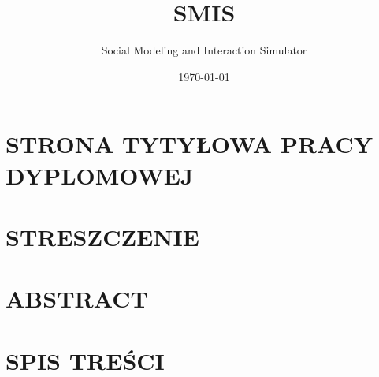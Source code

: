\documentclass{article}
\title{SMIS}
\author{Social Modeling and Interaction Simulator}
\date{\today}
\begin{document}
    \section*{STRONA TYTYŁOWA PRACY DYPLOMOWEJ}
    \section*{STRESZCZENIE}
    \section*{ABSTRACT}
    \section*{SPIS TREŚCI}
\end{document}

